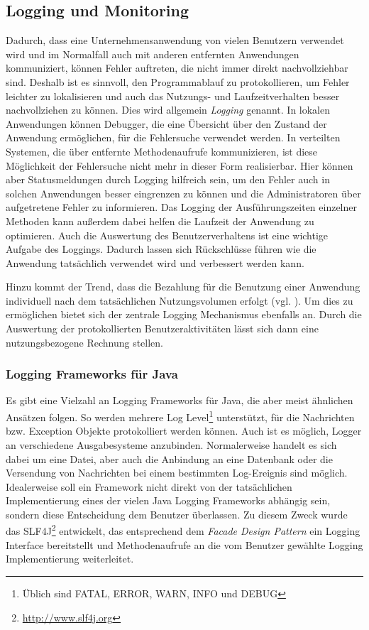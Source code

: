 \subsection{Logging und Monitoring}\label{service:logging}
Dadurch, dass eine Unternehmensanwendung von vielen Benutzern verwendet wird und
im Normalfall auch mit anderen entfernten Anwendungen kommuniziert, können
Fehler auftreten, die nicht immer direkt nachvollziehbar sind. Deshalb ist es
sinnvoll, den Programmablauf zu protokollieren, um Fehler leichter zu
lokalisieren und auch das Nutzungs- und Laufzeitverhalten besser nachvollziehen zu können. Dies wird
allgemein \emph{Logging} genannt. In lokalen Anwendungen können Debugger, die
eine Übersicht über den Zustand der Anwendung ermöglichen, für die Fehlersuche
verwendet werden. In verteilten Systemen, die über entfernte Methodenaufrufe
kommunizieren, ist diese Möglichkeit der Fehlersuche nicht mehr in dieser Form
realisierbar. Hier können aber Statusmeldungen durch Logging hilfreich sein, um
den Fehler auch in solchen Anwendungen besser eingrenzen zu können und die
Administratoren über aufgetretene Fehler zu informieren. Das Logging der
Ausführungszeiten einzelner Methoden kann außerdem dabei helfen die Laufzeit der
Anwendung zu optimieren. Auch die Auswertung des Benutzerverhaltens ist eine
wichtige Aufgabe des Loggings. Dadurch lassen sich Rückschlüsse führen
wie die Anwendung tatsächlich verwendet wird und verbessert werden kann.

Hinzu kommt der Trend, dass die Bezahlung für die Benutzung einer Anwendung
individuell nach dem tatsächlichen Nutzungsvolumen erfolgt (vgl.
\cite{brandon:2009}). Um dies zu ermöglichen bietet sich der zentrale Logging
Mechanismus ebenfalls an. Durch die Auswertung der protokollierten
Benutzeraktivitäten lässt sich dann eine nutzungsbezogene Rechnung stellen.

\subsubsection{Logging Frameworks für Java}
Es gibt eine Vielzahl an Logging Frameworks für Java, die aber meist ähnlichen
Ansätzen folgen. So werden mehrere Log Level\footnote{Üblich sind FATAL, ERROR,
WARN, INFO und DEBUG} unterstützt, für die Nachrichten bzw. Exception Objekte
protokolliert werden können. Auch ist es möglich, Logger an verschiedene
Ausgabesysteme anzubinden. Normalerweise handelt es sich dabei um eine Datei,
aber auch die Anbindung an eine Datenbank oder die Versendung von Nachrichten bei einem
bestimmten Log-Ereignis sind möglich. Idealerweise soll ein Framework nicht
direkt von der tatsächlichen Implementierung eines der vielen Java Logging
Frameworks abhängig sein, sondern diese Entscheidung dem Benutzer überlassen. Zu
diesem Zweck wurde das \ac{SLF4J}\footnote{\url{http://www.slf4j.org}}
entwickelt, das entsprechend dem \emph{Facade Design Pattern} ein Logging Interface bereitstellt und Methodenaufrufe an die
vom Benutzer gewählte Logging Implementierung weiterleitet.

